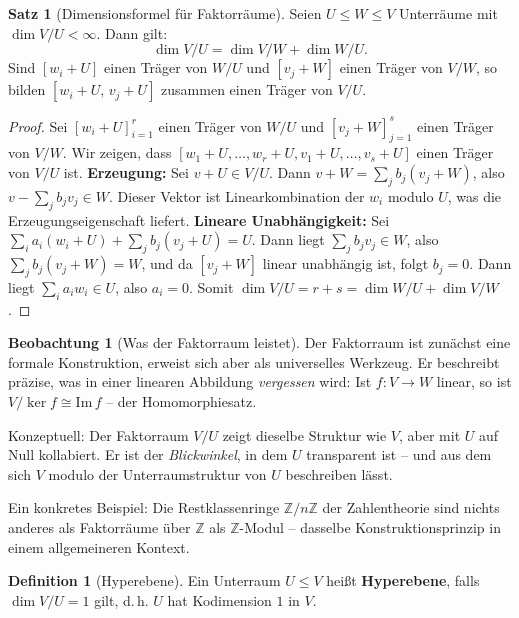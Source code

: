 ﻿\documentclass[a4paper,12pt]{report}
\theoremstyle{definition}
\newtheorem{definition}{Definition}
\newtheorem{satz}{Satz}
\newtheorem{beobachtung}{Beobachtung}
\begin{document}
\begin{satz}[Dimensionsformel für Faktorräume]
    Seien $U \leq W \leq V$ Unterräume mit $\dim V/U < \infty$. Dann gilt:
    \[
        \dim V/U = \dim V/W + \dim W/U.
    \]
    Sind $[w_i + U]$ einen Träger von $W/U$ und $[v_j + W]$ einen Träger
    von $V/W$, so bilden $[w_i + U,\, v_j + U]$ zusammen einen Träger
    von $V/U$.
\end{satz}
\begin{proof}
    Sei $[w_i + U]_{i=1}^r$ einen Träger von $W/U$ und $[v_j + W]_{j=1}^s$
    einen Träger von $V/W$. Wir zeigen, dass $[w_1 + U, \ldots, w_r + U,
    v_1 + U, \ldots, v_s + U]$ einen Träger von $V/U$ ist.
    \textbf{Erzeugung:} Sei $v + U \in V/U$. Dann $v + W = \sum_j b_j(v_j + W)$,
    also $v - \sum_j b_j v_j \in W$. Dieser Vektor ist Linearkombination
    der $w_i$ modulo $U$, was die Erzeugungseigenschaft liefert.
    \textbf{Lineare Unabhängigkeit:} Sei $\sum_i a_i(w_i + U) + \sum_j b_j(v_j + U) = U$.
    Dann liegt $\sum_j b_j v_j \in W$, also $\sum_j b_j(v_j + W) = W$, und
    da $[v_j + W]$ linear unabhängig ist, folgt $b_j = 0$. Dann liegt
    $\sum_i a_i w_i \in U$, also $a_i = 0$.
    Somit $\dim V/U = r + s = \dim W/U + \dim V/W$.
\end{proof}


\begin{beobachtung}[Was der Faktorraum leistet]
    Der Faktorraum ist zunächst eine formale Konstruktion, erweist sich
    aber als universelles Werkzeug. Er beschreibt präzise, was in einer
    linearen Abbildung \emph{vergessen} wird: Ist $f : V \to W$ linear,
    so ist $V/\ker f \cong \mathrm{Im}\, f$ -- der Homomorphiesatz.

    Konzeptuell: Der Faktorraum $V/U$ zeigt dieselbe Struktur wie $V$,
    aber mit $U$ auf Null kollabiert. Er ist der \emph{Blickwinkel}, in dem
    $U$ transparent ist -- und aus dem sich $V$ modulo der Unterraumstruktur
    von $U$ beschreiben lässt.

    Ein konkretes Beispiel: Die Restklassenringe $\mathbb{Z}/n\mathbb{Z}$
    der Zahlentheorie sind nichts anderes als Faktorräume über $\mathbb{Z}$
    als $\mathbb{Z}$-Modul -- dasselbe Konstruktionsprinzip in einem
    allgemeineren Kontext.
\end{beobachtung}

\begin{definition}[Hyperebene]
    Ein Unterraum $U \leq V$ heißt \textbf{Hyperebene}, falls
    $\dim V/U = 1$ gilt, d.\,h. $U$ hat Kodimension $1$ in $V$.
\end{definition}
\end{document}
